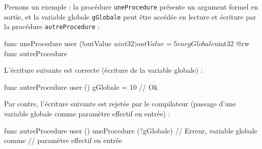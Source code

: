 Prenons un exemple ; la procédure \texttt{uneProcedure} présente un argument formel en sortie, et la variable globale \texttt{gGlobale} peut être accédée en lecture et écriture par la procédure \texttt{autreProcedure} :
\begin{PLM}
func uneProcedure user (!outValue $uint32) {
  outValue = 5
}

var gGlobale $uint32 {
  @rw func autreProcedure
}
\end{PLM}

L'écriture suivante est correcte (écriture de la variable globale) :
\begin{PLM}
func autreProcedure user () {
  gGlobale = 10 // Ok
}
\end{PLM}


Par contre, l'écriture suivante est rejetée par le compilateur (passage d'une variable globale comme paramètre effectif en entrée) :
\begin{PLM}
func autreProcedure user () {
  uneProcedure (?gGlobale) // Erreur, variable globale comme
                           // paramètre effectif en entrée
}
\end{PLM}

